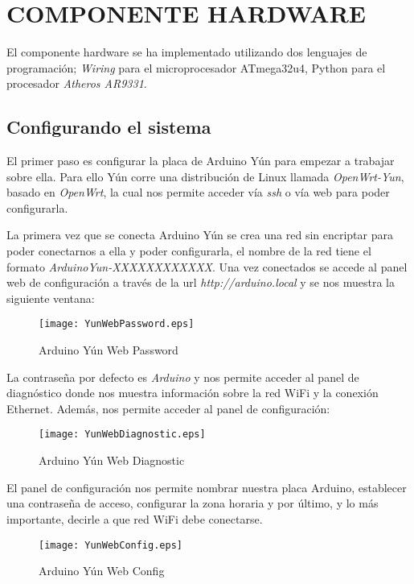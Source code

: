 \section{COMPONENTE HARDWARE}

El componente hardware se ha implementado utilizando dos lenguajes de programación; \emph{Wiring} para el microprocesador ATmega32u4, Python para el procesador \emph{Atheros AR9331}.

\subsection{Configurando el sistema}

El primer paso es configurar la placa de Arduino Yún para empezar a trabajar sobre ella. Para ello Yún corre una distribución de Linux llamada \emph{OpenWrt-Yun}, basado en \emph{OpenWrt}, la cual nos permite acceder vía \emph{ssh} o vía web para poder configurarla. 

La primera vez que se conecta Arduino Yún se crea una red sin encriptar para poder conectarnos a ella y poder configurarla, el nombre de la red tiene el formato \emph{ArduinoYun-XXXXXXXXXXXX}. Una vez conectados se accede al panel web de configuración a través de la url \emph{http://arduino.local} y se nos muestra la siguiente ventana:

\begin{figure}[H]
    \centering
    \texttt{[image: YunWebPassword.eps]}
    \caption{Arduino Yún Web Password}\label{fig:yun-web-password}
\end{figure}

La contraseña por defecto es \emph{Arduino} y nos permite acceder al panel de diagnóstico donde nos muestra información sobre la red WiFi y la conexión Ethernet. Además, nos permite acceder al panel de configuración:

\begin{figure}[H]
    \centering
    \texttt{[image: YunWebDiagnostic.eps]}
    \caption{Arduino Yún Web Diagnostic}\label{fig:yun-web-diagnostic}
\end{figure}

El panel de configuración nos permite nombrar nuestra placa Arduino, establecer una contraseña de acceso, configurar la zona horaria y por último, y lo más importante, decirle a que red WiFi debe conectarse.

\begin{figure}[H]
    \centering
    \texttt{[image: YunWebConfig.eps]}
    \caption{Arduino Yún Web Config}\label{fig:yun-web-config}
\end{figure}

